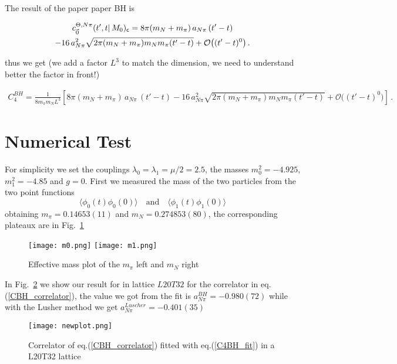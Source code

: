 \documentclass[10pt,a4paper]{article}
\begin{document}
 The result of the paper  paper BH is 
 \begin{tcolorbox}
 
 \begin{multline}
c^{\Theta, N \pi}_{\vec 0}(t', t \vert \, M_0) _{\sf c} = 8 \pi (m_N + m_\pi) \, a_{N\pi} \, (t' - t ) \\
- 16 \, a_{N \pi}^2 \sqrt{2 \pi (m_N + m_\pi) m_N m_\pi (t'-t)} + \mathcal O \big ((t'-t)^0\big) \,.\nonumber
\end{multline}
 \end{tcolorbox}
 
thus we get (we add a factor $L^3$ to match the dimension, we need to understand better the factor in front!)

\begin{multline}
 C_4^{BH}=  \frac{1}{8m_\pi m_N L^3}\left[ 8 \pi (m_N + m_\pi) \, a_{N\pi} \, (t' - t ) 
- 16 \, a_{N \pi}^2 \sqrt{2 \pi (m_N + m_\pi) m_N m_\pi (t'-t)} + \mathcal O \big ((t'-t)^0\big) \right]\,.
\label{C4BH_fit}
\end{multline} 
 
\section{Numerical Test}
For simplicity we set the couplings $\lambda_0=\lambda_1=\mu/2=2.5$, the masses $m_0^2=-4.925$, $m_1^2=-4.85$ and $g=0$.
First we measured the mass of the two particles from the two point functions
\begin{equation}
\langle \phi_0(t) \phi_0(0)\rangle \quad\mbox{and}\quad
\langle \phi_1(t) \phi_1(0)\rangle
\end{equation}
obtaining $m_\pi=0.14653(11)$ and 	$m_N=0.274853(80)$, the corresponding plateaux are in Fig.~\ref{plot_meff}
\begin{figure}[!ht]
 \centering
\texttt{[image: m0.png]}
\texttt{[image: m1.png]}
\caption{Effective mass plot of the $m_\pi$ left and $m_N$ right }
\label{plot_meff}
\end{figure}



In Fig.~\ref{plot_C4BH} we show our result for in lattice $L20T32$ for the 
correlator in eq.(\ref{CBH_correlator}), the value we got from the fit is 
$a_{N\pi}^{BH}=-0.980(72)$ while with the Lusher method we get $a_{N\pi}^{Luscher}=-0.401(35)$
\newpage
\begin{figure}[!ht]
 \centering
\texttt{[image: newplot.png]}
\caption{Correlator of eq.(\ref{CBH_correlator}) fitted with eq.(\ref{C4BH_fit}) in a L20T32 lattice }
\label{plot_C4BH}
\end{figure}
 
\end{document}
